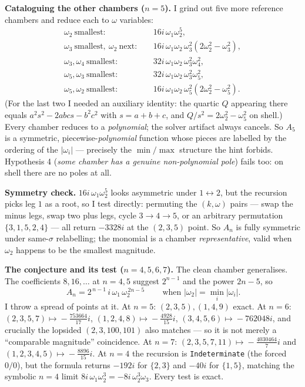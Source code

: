 \documentclass[11pt]{article}
\begin{document}
\medskip
\noindent\textbf{Cataloguing the other chambers ($n=5$).}
I grind out five more reference chambers and reduce each to $\omega$ variables:
\begin{align*}
\omega_2\ \text{smallest}:&\quad 16i\,\omega_1\omega_2^5,\\
\omega_3\ \text{smallest},\ \omega_2\ \text{next}:&\quad 16i\,\omega_1\omega_2\,\omega_3^2(2\omega_2^2-\omega_3^2),\\
\omega_3,\omega_4\ \text{smallest}:&\quad 32i\,\omega_1\omega_2\,\omega_3^2\omega_4^2,\\
\omega_5,\omega_3\ \text{smallest}:&\quad 32i\,\omega_1\omega_2\,\omega_3^2\omega_5^2,\\
\omega_5,\omega_2\ \text{smallest}:&\quad 16i\,\omega_1\omega_2\,\omega_5^2(2\omega_2^2-\omega_5^2).
\end{align*}
(For the last two I needed an auxiliary identity: the quartic $Q$ appearing there equals
$a^2s^2-2abcs-b^2c^2$ with $s=a+b+c$, and $Q/s^2=2\omega_2^2-\omega_5^2$ on shell.) Every
chamber reduces to a \emph{polynomial}; the solver artifact always cancels. So $A_5$ is a
symmetric, piecewise-\emph{polynomial} function whose pieces are labelled by the ordering of
the $|\omega_i|$ --- precisely the $\min/\max$ structure the hint forbids. Hypothesis 4
(\emph{some chamber has a genuine non-polynomial pole}) fails too: on shell there are no
poles at all.

\medskip
\noindent\textbf{Symmetry check.}
$16i\,\omega_1\omega_2^5$ looks asymmetric under $1\leftrightarrow2$, but the recursion picks
leg $1$ as a root, so I test directly: permuting the $(k,\omega)$ pairs --- swap the minus
legs, swap two plus legs, cycle $3\!\to\!4\!\to\!5$, or an arbitrary permutation
$\{3,1,5,2,4\}$ --- all return $-3328i$ at the $(2,3,5)$ point. So $A_n$ is fully symmetric
under same-$\sigma$ relabelling; the monomial is a chamber \emph{representative}, valid when
$\omega_2$ happens to be the smallest magnitude.

\medskip
\noindent\textbf{The conjecture and its test ($n=4,5,6,7$).}
The clean chamber generalises. The coefficients $8,16,\dots$ at $n=4,5$ suggest $2^{n-1}$ and
the power $2n-5$, so
\[
\boxed{\,A_n=2^{\,n-1}\,i\,\omega_1\,\omega_2^{\,2n-5}\,}\qquad\text{when }|\omega_2|=\min_i|\omega_i| .
\]
I throw a spread of points at it. At $n=5$: $(2,3,5),(1,4,9)$ exact. At $n=6$:
$(2,3,5,7)\!\mapsto\!-\tfrac{753664}{17}i$, $(1,2,4,8)\!\mapsto\!-\tfrac{4928}{15}i$,
$(3,4,5,6)\!\mapsto\!-762048i$, and crucially the lopsided $(2,3,100,101)$ also matches ---
so it is not merely a ``comparable magnitude'' coincidence. At $n=7$:
$(2,3,5,7,11)\!\mapsto\!-\tfrac{4030464}{7}i$ and $(1,2,3,4,5)\!\mapsto\!-\tfrac{8896}{15}i$.
At $n=4$ the recursion is \texttt{Indeterminate} (the forced $0/0$), but the formula returns
$-192i$ for $\{2,3\}$ and $-40i$ for $\{1,5\}$, matching the symbolic $n=4$ limit
$8i\,\omega_1\omega_2^3=-8i\,\omega_2^3\omega_3$. Every test is exact.
\end{document}
